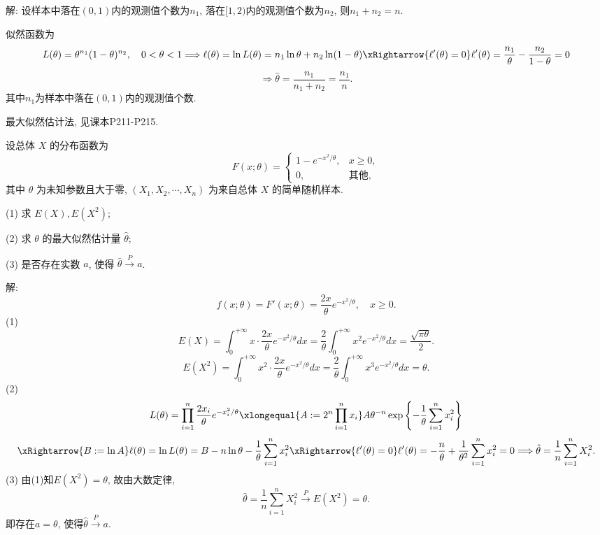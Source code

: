 \documentclass[standard]{ExBook}
\renewenvironment{shaded}{%
  \def\FrameCommand{\fboxsep=\FrameSep \colorbox{shadecolor}}%
  \MakeFramed{\advance\hsize-\width \FrameRestore}%
}{%
  \endMakeFramed
}
\begin{document}
\begin{qitems}
\vspace{\dimexpr2.5cm-5em\relax}

解: 设样本中落在$(0,1)$内的观测值个数为$n_1$, 落在$[1,2)$内的观测值个数为$n_2$, 则$n_1+n_2=n$.

似然函数为
$$
L(\theta)
=\theta^{n_1}(1-\theta)^{n_2},\quad 0<\theta<1
\Longrightarrow
\ell(\theta)=\ln L(\theta)
=n_1\ln\theta+n_2\ln(1-\theta)
\xRightarrow{\ell'(\theta)=0}
\ell'(\theta)=\frac{n_1}{\theta}-\frac{n_2}{1-\theta}=0
$$
$$
\Longrightarrow
\hat{\theta}
=\frac{n_1}{n_1+n_2}
=\frac{n_1}{n}.
$$
其中$n_1$为样本中落在$(0,1)$内的观测值个数.

\textcolor{themeColor}{\selectfont {} 最大似然估计法, 见课本P211-P215.}

\vspace{2.5cm-5em}

    \begin{bbox}
    \begin{shaded}
        \qitem
设总体 \(X\) 的分布函数为
\[F(x; \theta) =
\begin{cases} 
1 - e^{-x^2/\theta}, & x \geq 0, \\
0, & \text{其他},
\end{cases}\]
其中 \(\theta\) 为未知参数且大于零, \((X_1, X_2, \cdots, X_n)\) 为来自总体 \(X\) 的简单随机样本.

(1) 求 \(E(X), E(X^2)\);

(2) 求 \(\theta\) 的最大似然估计量 \(\hat{\theta}\);

(3) 是否存在实数 \(a\), 使得 \(\hat{\theta} \overset{P}{\longrightarrow} a\).
    \end{shaded}
    \end{bbox}

\vspace{\dimexpr2.5cm-5em\relax}

解: 
$$
f(x;\theta)=F'(x;\theta)=\frac{2x}{\theta}e^{-x^2/\theta},\quad x\geq0.
$$
(1)
$$
E(X)=\int_{0}^{+\infty}x\cdot\frac{2x}{\theta}e^{-x^2/\theta}dx
=\frac{2}{\theta}\int_{0}^{+\infty}x^2e^{-x^2/\theta}dx
=\frac{\sqrt{\pi\theta}}{2}.
$$
$$
E(X^2)=\int_{0}^{+\infty}x^2\cdot\frac{2x}{\theta}e^{-x^2/\theta}dx
=\frac{2}{\theta}\int_{0}^{+\infty}x^3e^{-x^2/\theta}dx
=\theta.
$$
(2)
$$
L(\theta)
=\prod_{i=1}^{n}\frac{2x_i}{\theta}e^{-x_i^2/\theta}
\xlongequal{A:=2^n\prod\limits_{i=1}^{n}x_i}
A\theta^{-n}\exp\left\{-\frac{1}{\theta}\sum_{i=1}^{n}x_i^2\right\}
$$
$$
\xRightarrow{B:=\ln A}
\ell(\theta)=\ln L(\theta)
=B-n\ln\theta-\frac{1}{\theta}\sum_{i=1}^{n}x_i^2
\xRightarrow{\ell'(\theta)=0}
\ell'(\theta)
=-\frac{n}{\theta}+\frac{1}{\theta^2}\sum_{i=1}^{n}x_i^2=0
\Longrightarrow
\hat{\theta}
=\frac{1}{n}\sum_{i=1}^{n}X_i^2.
$$
(3) 由(1)知$E(X^2)=\theta$, 故由大数定律,
$$
\hat{\theta}
=\frac{1}{n}\sum_{i=1}^{n}X_i^2
\xrightarrow{P}
E(X^2)
=\theta.
$$
即存在$a=\theta$, 使得$\hat{\theta}\xrightarrow{P}a$.


\end{qitems}
\end{document}
